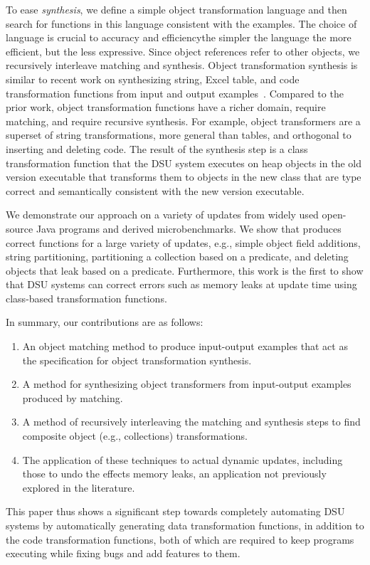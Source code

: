 To ease \TOS \emph{synthesis}, we define a simple \TOS object
transformation language and then search for functions in this language
consistent with the examples.  The choice of language is crucial to
accuracy and efficiency\textemdash the simpler the language the more
efficient, but the less expressive.  Since object references refer to
other objects, we recursively interleave matching and synthesis.
Object transformation synthesis is similar to recent work on
synthesizing string, Excel table, and code transformation functions
from input and output
examples~\cite{Gulwani:popl:11,Gulwani:pldi:11,MKM:11}.  Compared to
the prior work, \TOS object transformation functions have a richer
domain, require matching, and require recursive synthesis. For example, object transformers  are a
superset of string transformations, more general than tables, and
orthogonal to inserting and deleting code.  The result of the \TOS
synthesis step is a class transformation function that the DSU system
executes on heap objects in the old version executable that transforms
them to objects in the new class that are type correct and
semantically consistent with the new version executable.

We demonstrate our approach on a variety of updates from
widely used open-source Java programs and derived microbenchmarks. We show
that \TOS produces correct functions for a large variety of updates,
e.g., simple object field additions, string partitioning, partitioning
a collection based on a predicate, and deleting objects that leak
based on a predicate. Furthermore, this work is the first to show that
DSU systems can correct errors such as memory leaks at update time
using class-based transformation functions.

In summary, our contributions are as follows:
\begin{enumerate}
\item An object matching method to produce input-output examples
  that act as the specification for object transformation synthesis.
\item A method for synthesizing object transformers from input-output
  examples produced by matching.
\item A method of recursively interleaving the matching and synthesis
  steps to find composite object (e.g., collections) transformations.
\item The application of these techniques to actual dynamic updates,
  including those to undo the effects memory leaks, an application not
  previously explored in the literature.
\end{enumerate}

This paper thus shows a significant step towards completely automating
DSU systems by automatically generating data transformation functions,
in addition to the code transformation functions, both of which are
required to keep programs executing while fixing bugs and add features
to them.

